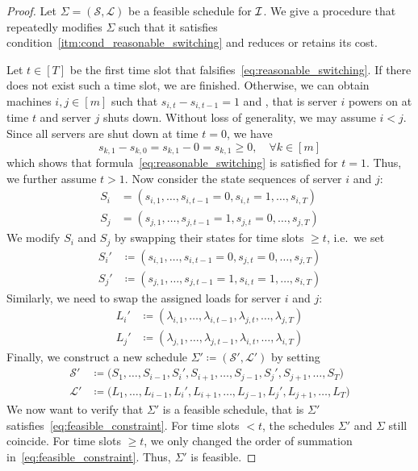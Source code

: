 \begin{proof}
Let $\Sigma=(\mathcal{S},\mathcal{L})$ be a feasible schedule for $\mathcal{I}$. We give a procedure that repeatedly modifies $\Sigma$ such that it satisfies condition~\ref{itm:cond_reasonable_switching} and reduces or retains its cost.
	
Let $t\in[T]$ be the first time slot that falsifies~\eqref{eq:reasonable_switching}. If there does not exist such a time slot, we are finished. Otherwise, we can obtain machines $i,j\in[m]$ such that $s_{i,t}-s_{i,t-1}=1$ and , that is server $i$ powers on at time $t$ and server $j$ shuts down. Without loss of generality, we may assume $i<j$. Since all servers are shut down at time $t=0$, we have
\begin{equation*}
	s_{k,1}-s_{k,0}=s_{k,1}-0=s_{k,1}\ge 0,\quad\forall k\in[m]
\end{equation*}
which shows that formula~\eqref{eq:reasonable_switching} is satisfied for $t=1$. Thus, we further assume $t>1$. Now consider the state sequences of server $i$ and $j$:
\begin{align*}
	S_i&=(s_{i,1},\dotsc,s_{i,t-1}=0,s_{i,t}=1,\dotsc,s_{i,T})\\
	S_j&=(s_{j,1},\dotsc,s_{j,t-1}=1,s_{j,t}=0,\dotsc,s_{j,T})
\end{align*}
We modify $S_i$ and $S_j$ by swapping their states for time slots $\ge t$, i.e.\ we set
\begin{align*}
	S_i'&\coloneqq(s_{i,1},\dotsc,s_{i,t-1}=0,s_{j,t}=0,\dotsc,s_{j,T})\\
	S_j'&\coloneqq(s_{j,1},\dotsc,s_{j,t-1}=1,s_{i,t}=1,\dotsc,s_{i,T})
\end{align*}
Similarly, we need to swap the assigned loads for server $i$ and $j$:
\begin{align*}
	L_i'&\coloneqq(\lambda_{i,1},\dotsc,\lambda_{i,t-1},\lambda_{j,t},\dotsc,\lambda_{j,T})\\
	L_j'&\coloneqq(\lambda_{j,1},\dotsc,\lambda_{j,t-1},\lambda_{i,t},\dotsc,\lambda_{i,T})
\end{align*}
Finally, we construct a new schedule $\Sigma'\coloneqq(\mathcal{S}',\mathcal{L}')$ by setting
\begin{align*}
	\mathcal{S}'&\coloneqq\bigl(S_1,\dotsc,S_{i-1},S_i',S_{i+1},\dotsc,S_{j-1},S_j',S_{j+1},\dotsc,S_T\bigr)\\
	\mathcal{L}'&\coloneqq\bigl(L_1,\dotsc,L_{i-1},L_i',L_{i+1},\dotsc,L_{j-1},L_j',L_{j+1},\dotsc,L_T\bigr)
\end{align*}
We now want to verify that $\Sigma'$ is a feasible schedule, that is $\Sigma'$ satisfies~\eqref{eq:feasible_constraint}. For time slots $<t$, the schedules $\Sigma'$ and $\Sigma$ still coincide. For time slots $\ge t$, we only changed the order of summation in~\eqref{eq:feasible_constraint}. Thus, $\Sigma'$ is feasible.


\end{proof}
